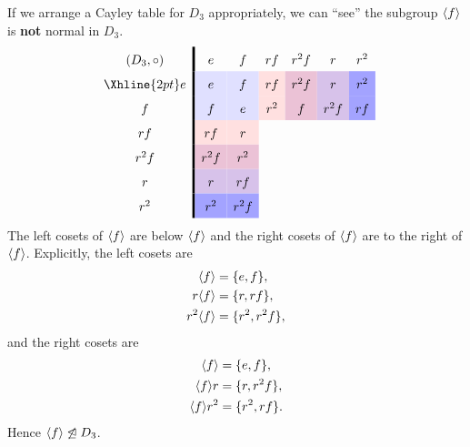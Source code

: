 \documentclass{ximera}
\begin{document}
\begin{example}\label{EG:fnn}
  If we arrange a Cayley table for $D_3$ appropriately, we can ``see''
  the subgroup $\langle f\rangle$ is \textbf{not} normal in $D_3$.
    \[
    \renewcommand{\arraystretch}{1.6}
    \begin{array}{c!{\vline width 2pt}cccccc}
      (D_3,\circ)& e                         & f                              & rf                            & r^2f                             & r                                    & r^2  \\  \Xhline{2pt}
      e          & e\cellcolor{blue!12!white}     & f\cellcolor{blue!12!white}    & rf\cellcolor{red!12!white}   & r^2f \cellcolor{blue!33!red!24!white}     & r  \cellcolor{blue!66!red!24!white}   & r^2 \cellcolor{blue!36!white} \\  
      f                & f\cellcolor{blue!12!white}    & e\cellcolor{blue!12!white}   & r^2 \cellcolor{red!12!white}    & f\cellcolor{blue!33!red!24!white} & r^2f \cellcolor{blue!66!red!24!white}    & rf \cellcolor{blue!36!white}   \\  
      rf                & rf\cellcolor{red!12!white}   & r\cellcolor{red!12!white}     &    &    &  &     \\  
      r^2f       & r^2f \cellcolor{blue!33!red!24!white}   & r^2 \cellcolor{blue!33!red!24!white}   &   &      &   &   \\  
      r      & r \cellcolor{blue!66!red!24!white}   & rf \cellcolor{blue!66!red!24!white} &    &   &      &     \\  
      r^2       & r^2 \cellcolor{blue!36!white} & r^2f \cellcolor{blue!36!white}    &   &    &     &      \\  
    \end{array}
    \]
    The left cosets of $\langle f\rangle$ are below $\langle f\rangle$ and the right cosets
    of $\langle f\rangle$ are to the right of $\langle f\rangle$. Explicitly, the left
    cosets are
    \begin{align*}
      \langle f\rangle &= \{e, f\},\\
      r\langle f\rangle &= \{r, rf\},\\
      r^2\langle f\rangle &= \{r^2, r^2f\},
    \end{align*}
    and the right cosets are
    \begin{align*}
      \langle f\rangle &= \{e, f\},\\
      \langle f\rangle r &= \{r, r^2f\},\\
      \langle f\rangle r^2&= \{r^2, rf\}.
    \end{align*}
    Hence $\langle f\rangle\not\trianglelefteq D_3$.
\end{example}
\end{document}
